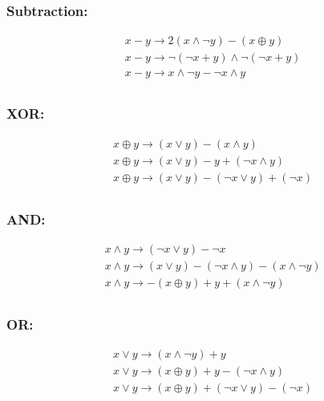 \documentclass[
  digital, %
  notable,   %
  twoside, %
  nolof,     %
  nolot,     %
]{fithesis3}
\theoremstyle{definition}
\begin{document}
\subsubsection{Subtraction:}
$$
\begin{aligned}
&x-y \rightarrow 2(x \wedge \neg y) - (x \oplus y) \\
& x - y \rightarrow \neg ( \neg x + y) \wedge \neg(\neg x + y) \\
& x - y \rightarrow x \wedge \neg y - \neg x \wedge y \\
\end{aligned}
$$

\subsubsection{XOR:}
$$
\begin{aligned}
&x \oplus y \rightarrow (x \vee y) - (x \wedge y) \\
&x \oplus y \rightarrow(x \vee y)-y+(\neg x \wedge y) \\
&x \oplus y \rightarrow(x \vee y)-(\neg x \vee y)+(\neg x) \\
\end{aligned}
$$

\subsubsection{AND:}
$$
\begin{aligned}
&x \wedge y \rightarrow (\neg x \vee y) - \neg x  \\
&x \wedge y \rightarrow(x \vee y)-(\neg x \wedge y)-(x \wedge \neg y) \\
&x \wedge y \rightarrow-(x \oplus y)+y+(x \wedge \neg y) \\
\end{aligned}
$$

\subsubsection{OR:}
$$
\begin{aligned}
&x \vee y \rightarrow(x \wedge \neg y) + y\\
&x \vee y \rightarrow(x \oplus y)+y-(\neg x \wedge y) \\
&x \vee y \rightarrow(x \oplus y)+(\neg x \vee y)-(\neg x) \\
\end{aligned}
$$
\end{document}
